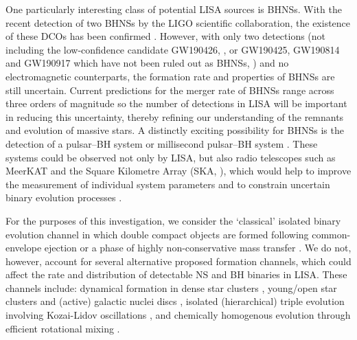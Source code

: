 One particularly interesting class of potential LISA sources is BHNSs. With the recent detection of two BHNSs by the LIGO scientific collaboration, the existence of these DCOs has been confirmed \citep{TheLIGOScientificCollaboration+2021}. However, with only two detections (not including the low-confidence candidate GW190426, \citealt{Abbott+2020_GWTC2}, or GW190425, GW190814 and GW190917 which have not been ruled out as BHNSs, \citealt{Abbott+2020_GW190425,Abbott+2020_GW190814, GWTC_2_1}) and no electromagnetic counterparts, the formation rate and properties of BHNSs are still uncertain. Current predictions for the merger rate of BHNSs range across three orders of magnitude \citep[e.g.][]{Abadie+2010, Mandel+2021} so the number of detections in LISA will be important in reducing this uncertainty, thereby refining our understanding of the remnants and evolution of massive stars. A distinctly exciting possibility for BHNSs is the detection of a pulsar--BH system or millisecond pulsar--BH system \citep{Narayan+1991, Pol+2021}. These systems could be observed not only by LISA, but also radio telescopes such as MeerKAT and the Square Kilometre Array (SKA, \citealt{Dewdney+2009}), which would help to improve the measurement of individual system parameters and to constrain uncertain binary evolution processes \citep[e.g.][]{Pfahl+2005,Chattopadhyay+2020}. 

For the purposes of this investigation, we consider the `classical' isolated binary evolution channel \citep[e.g.][]{Tutukov+1973,Tutukov+1993,Smarr+1976,Srinivasan+1989,Kalogera+2007,Belczynski+2016} in which double compact objects are formed following common-envelope ejection or a phase of highly non-conservative mass transfer \citep{Heuvel+2011, vandenHeuvel+2017}. We do not, however, account for several alternative proposed formation channels, which could affect the rate and distribution of detectable NS and BH binaries in LISA. These channels include: dynamical formation in dense star clusters \citep[e.g.][]{Sigurdsson+1993,PortegiesZwart+2000,Miller+2009,Rodriguez+2015}, young/open star clusters \citep[e.g.][]{Ziosi+2014, DiCarlo+2020, Banerjee+2020, Rastello+2020, Rastello+2021} and (active) galactic nuclei discs \citep[e.g.][]{Morris+1993, Antonini+2016, McKernan+2020}, isolated (hierarchical) triple evolution involving Kozai-Lidov oscillations \citep[e.g.][]{Stephan+2016, Silsbee+2017,Antonini+2017, Toonen+2020},  and chemically homogenous evolution through efficient rotational mixing \citep[e.g.][]{deMink+2009,Mandel+2016,Marchant+2016,Marchant+2017,duBuisson+2020}.

